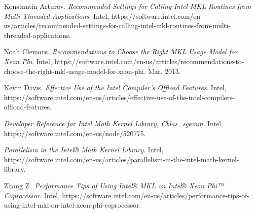 \documentclass{article}
\begin{document}
{%
\begin{thebibliography}{6}%
\label{sec-bibliography}%

Konstantin Arturov. \emph{Recommended Settings for Calling Intel MKL Routines from Multi-Threaded Applications}. Intel, https://software.intel.com/en-us/articles/recommended-settings-for-calling-intel-mkl-routines-from-multi-threaded-applications.\label{mkl_threads}%

Noah Clemons. \emph{Recommendations to Choose the Right MKL Usage Model for Xeon Phi}. Intel, https://software.intel.com/en-us/articles/recommendations-to-choose-the-right-mkl-usage-model-for-xeon-phi. Mar. 2013.\label{mkl-mic}%

Kevin Davis. \emph{Effective Use of the Intel Compiler’s Offload Features}. Intel, https://software.intel.com/en-us/articles/effective-use-of-the-intel-compilers-offload-features.\label{effective_use}%

\emph{Developer Reference for Intel Math Kernel Library, Cblas\_sgemm}. Intel, https://software.intel.com/en-us/node/520775.\label{sgemm}%

\emph{Parallelism in the Intel® Math Kernel Library}. Intel, https://software.intel.com/en-us/articles/parallelism-in-the-intel-math-kernel-library.\label{paramkl}%

Zhang Z.~\emph{Performance Tips of Using Intel® MKL on Intel® Xeon Phi™ Coprocessor}. Intel, https://software.intel.com/en-us/articles/performance-tips-of-using-intel-mkl-on-intel-xeon-phi-coprocessor.\label{page_file}%
\par%
\end{thebibliography}}%
\end{document}
